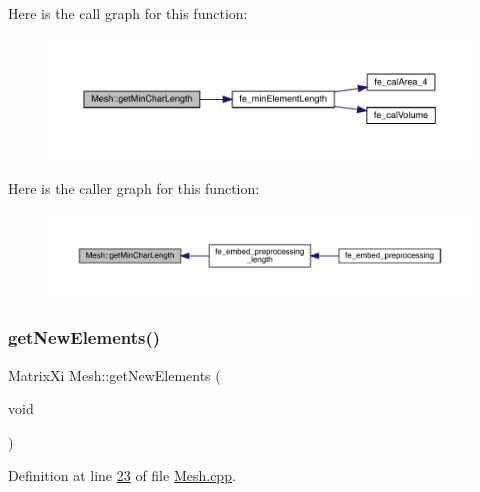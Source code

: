 Here is the call graph for this function\+:\nopagebreak
\begin{figure}[H]
\begin{center}
\leavevmode
\includegraphics[width=350pt]{class_mesh_a94ce58cb2598b1db2973ad357dae2710_cgraph}
\end{center}
\end{figure}
Here is the caller graph for this function\+:\nopagebreak
\begin{figure}[H]
\begin{center}
\leavevmode
\includegraphics[width=350pt]{class_mesh_a94ce58cb2598b1db2973ad357dae2710_icgraph}
\end{center}
\end{figure}
\mbox{\label{class_mesh_a6e425e9499e64ab52c4555aa3763651d}} 
\subsubsection{\texorpdfstring{get\+New\+Elements()}{getNewElements()}}
{\footnotesize\ttfamily Matrix\+Xi Mesh\+::get\+New\+Elements (\begin{DoxyParamCaption}\item[{void}]{ }\end{DoxyParamCaption})}



Definition at line \hyperlink{_mesh_8cpp_source_l00023}{23} of file \hyperlink{_mesh_8cpp_source}{Mesh.\+cpp}.

